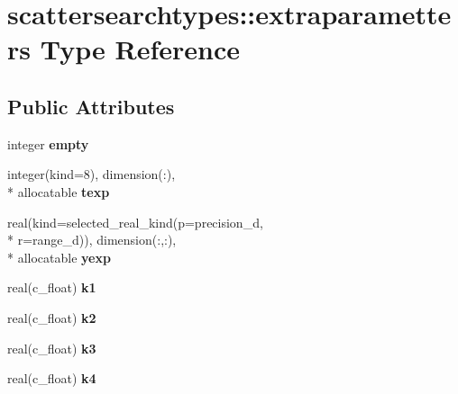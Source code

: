 \hypertarget{structscattersearchtypes_1_1extraparametters}{\section{scattersearchtypes\-:\-:extraparametters Type Reference}
\label{structscattersearchtypes_1_1extraparametters}
}
\subsection*{Public Attributes}
\begin{DoxyCompactItemize}
\item 
\hypertarget{structscattersearchtypes_1_1extraparametters_aa2ebd68e8477d32ad04b7087b20660ee}{integer {\bfseries empty}}\label{structscattersearchtypes_1_1extraparametters_aa2ebd68e8477d32ad04b7087b20660ee}

\item 
\hypertarget{structscattersearchtypes_1_1extraparametters_abcc8c66fa1e09c8eefe79c9354cc440c}{integer(kind=8), dimension(\-:), \\*
allocatable {\bfseries texp}}\label{structscattersearchtypes_1_1extraparametters_abcc8c66fa1e09c8eefe79c9354cc440c}

\item 
\hypertarget{structscattersearchtypes_1_1extraparametters_a1d3daf619957c0b9acb6b922eb217230}{real(kind=selected\-\_\-real\-\_\-kind(p=precision\-\_\-d, \\*
r=range\-\_\-d)), dimension(\-:,\-:), \\*
allocatable {\bfseries yexp}}\label{structscattersearchtypes_1_1extraparametters_a1d3daf619957c0b9acb6b922eb217230}

\item 
\hypertarget{structscattersearchtypes_1_1extraparametters_a041c7e2ec354650126e91af175cdbf7b}{real(c\-\_\-float) {\bfseries k1}}\label{structscattersearchtypes_1_1extraparametters_a041c7e2ec354650126e91af175cdbf7b}

\item 
\hypertarget{structscattersearchtypes_1_1extraparametters_af4deec1bba70e452a0aef2f6468ab567}{real(c\-\_\-float) {\bfseries k2}}\label{structscattersearchtypes_1_1extraparametters_af4deec1bba70e452a0aef2f6468ab567}

\item 
\hypertarget{structscattersearchtypes_1_1extraparametters_a8cece603eeddfdb208091c1f9418b3a3}{real(c\-\_\-float) {\bfseries k3}}\label{structscattersearchtypes_1_1extraparametters_a8cece603eeddfdb208091c1f9418b3a3}

\item 
\hypertarget{structscattersearchtypes_1_1extraparametters_ad6d1836696c8ced0ca1f286d136aef4a}{real(c\-\_\-float) {\bfseries k4}}\label{structscattersearchtypes_1_1extraparametters_ad6d1836696c8ced0ca1f286d136aef4a}

\end{DoxyCompactItemize}


